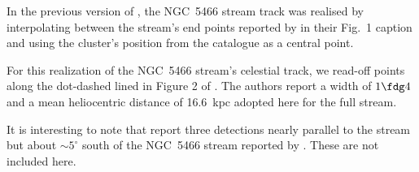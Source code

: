 In the previous version of \galstreams, the NGC~5466 stream track was realised by interpolating between the stream's end points
reported by \citet{Grillmair2006_5466} in their  Fig.~1 caption and using the cluster's position from the
\citet[][2010 edition]{Harris1996} catalogue as a central point.

For this realization of the NGC~5466 stream's celestial track, we read-off points along the dot-dashed lined in Figure 2 of \citet{Grillmair2006_5466}. The authors report a width of $1\fdg4$ and a mean heliocentric distance of 16.6~kpc adopted here for the full stream.

It is interesting to note that \citet{Weiss2018} report three detections nearly parallel to the stream but about $\sim 5^\circ$ south of the NGC~5466 stream reported by \citet{Grillmair2006_5466}. These are not included here.

